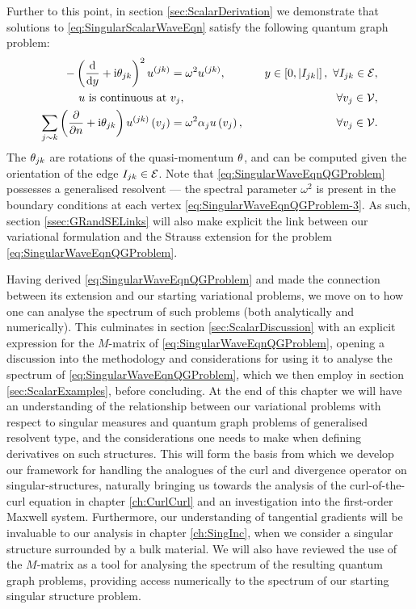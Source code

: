 Further to this point, in section \ref{sec:ScalarDerivation} we demonstrate that solutions to \eqref{eq:SingularScalarWaveEqn} satisfy the following quantum graph problem:
\begin{subequations} \label{eq:SingularWaveEqnQGProblem}
	\begin{align}
		-\left( \dfrac{\mathrm{d}}{\mathrm{d}y} + \mathrm{i}\theta_{jk} \right)^2 u^{(jk)} &= \omega^2 u^{(jk)}, \quad &y\in\left[ 0,\left\lvert I_{jk} \right\rvert \right], \ \forall I_{jk}\in\mathcal{E}, \label{eq:SingularWaveEqnQGProblem-1} \\
		u \text{ is continuous at } & v_j, \quad &\forall v_j\in\mathcal{V}, \label{eq:SingularWaveEqnQGProblem-2} \\
		\sum_{j\sim k}\left( \dfrac{\partial }{\partial n} + \mathrm{i}\theta_{jk} \right)u^{(jk)}\left( v_j \right) &= \omega^2\alpha_j u\left( v_j \right), \quad &\forall v_j\in\mathcal{V}. \label{eq:SingularWaveEqnQGProblem-3}
	\end{align}
\end{subequations}
The $\theta_{jk}$ are rotations of the quasi-momentum $\theta$, and can be computed given the orientation of the edge $I_{jk}\in\mathcal{E}$.
Note that \eqref{eq:SingularWaveEqnQGProblem} possesses a generalised resolvent --- the spectral parameter $\omega^2$ is present in the boundary conditions at each vertex \eqref{eq:SingularWaveEqnQGProblem-3}.
As such, section \ref{ssec:GRandSELinks} will also make explicit the link between our variational formulation and the Strauss extension for the problem \eqref{eq:SingularWaveEqnQGProblem}.

Having derived \eqref{eq:SingularWaveEqnQGProblem} and made the connection between its extension and our starting variational problems, we move on to how one can analyse the spectrum of such problems (both analytically and numerically).
This culminates in section \ref{sec:ScalarDiscussion} with an explicit expression for the $M$-matrix of \eqref{eq:SingularWaveEqnQGProblem}, opening a discussion into the methodology and considerations for using it to analyse the spectrum of \eqref{eq:SingularWaveEqnQGProblem}, which we then employ in section \ref{sec:ScalarExamples}, before concluding.
At the end of this chapter we will have an understanding of the relationship between our variational problems with respect to singular measures and quantum graph problems of generalised resolvent type, and the considerations one needs to make when defining derivatives on such structures.
This will form the basis from which we develop our framework for handling the analogues of the curl and divergence operator on singular-structures, naturally bringing us towards the analysis of the curl-of-the-curl equation in chapter \ref{ch:CurlCurl} and an investigation into the first-order Maxwell system.
Furthermore, our understanding of tangential gradients will be invaluable to our analysis in chapter \ref{ch:SingInc}, when we consider a singular structure surrounded by a bulk material.
We will also have reviewed the use of the $M$-matrix as a tool for analysing the spectrum of the resulting quantum graph problems, providing access numerically to the spectrum of our starting singular structure problem.